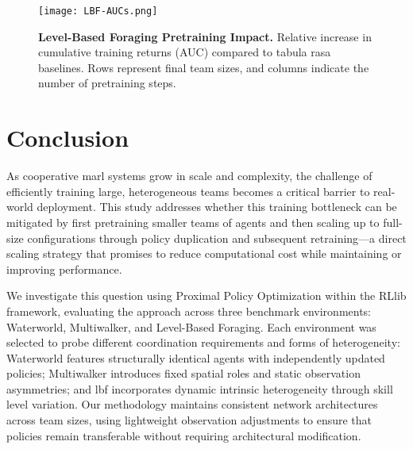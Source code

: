 \documentclass{article}
\begin{document}
\begin{figure}[ht]
    \centering
    \texttt{[image: LBF-AUCs.png]}
    \caption{\textbf{Level-Based Foraging Pretraining Impact.} 
    Relative increase in cumulative training returns (AUC) compared to tabula rasa baselines. 
    Rows represent final team sizes, and columns indicate the number of pretraining steps.}
    \label{con1:fig:lbf-aucs}
\end{figure}

\FloatBarrier


\section{Conclusion}

As cooperative \gls{marl} systems grow in scale and complexity, the challenge of efficiently 
training large, heterogeneous teams becomes a critical barrier to real-world deployment. 
This study addresses whether this training bottleneck can be mitigated by 
first pretraining smaller teams of agents and then scaling up to full-size configurations 
through policy duplication and subsequent retraining—a direct scaling strategy that 
promises to reduce computational cost while maintaining or improving performance.

We investigate this question using Proximal Policy Optimization within the 
RLlib framework, evaluating the approach across three benchmark environments: 
Waterworld, Multiwalker, and Level-Based Foraging. Each environment was 
selected to probe different coordination requirements and forms of heterogeneity: 
Waterworld features structurally identical agents with independently updated policies; 
Multiwalker introduces fixed spatial roles and static observation asymmetries; 
and \gls{lbf} incorporates dynamic intrinsic heterogeneity through 
skill level variation. Our methodology maintains consistent network architectures across 
team sizes, using lightweight observation adjustments to ensure that policies remain 
transferable without requiring architectural modification.
\end{document}
